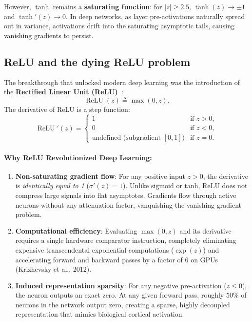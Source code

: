 However, $\tanh$ remains a \textbf{saturating function}: for $|z| \ge 2.5$, $\tanh(z) \to \pm 1$ and $\tanh'(z) \to 0$. In deep networks, as layer pre-activations naturally spread out in variance, activations drift into the saturating asymptotic tails, causing vanishing gradients to persist.

\subsection{ReLU and the dying ReLU problem}
\label{sec:relu_and_dying_relu}

The breakthrough that unlocked modern deep learning was the introduction of the \textbf{Rectified Linear Unit (ReLU)}~\cite{nair2010rectified,glorot2011deep}:
\begin{equation}
\operatorname{ReLU}(z) \triangleq \max(0, z).
\label{eq:relu_definition}
\end{equation}
The derivative of ReLU is a step function:
\begin{equation}
\operatorname{ReLU}'(z) = \begin{cases} 1 & \text{if } z > 0, \\ 0 & \text{if } z < 0, \\ \text{undefined (subgradient } [0, 1]\text{)} & \text{if } z = 0. \end{cases}
\label{eq:relu_derivative}
\end{equation}

\paragraph{Why ReLU Revolutionized Deep Learning:}
\begin{enumerate}[noitemsep,topsep=2pt,parsep=0pt,partopsep=0pt]
  \item \textbf{Non-saturating gradient flow}: For any positive input $z > 0$, the derivative is \textit{identically equal to 1} ($\sigma'(z) = 1$). Unlike sigmoid or tanh, ReLU does not compress large signals into flat asymptotes. Gradients flow through active neurons without any attenuation factor, vanquishing the vanishing gradient problem.
  \item \textbf{Computational efficiency}: Evaluating $\max(0, z)$ and its derivative requires a single hardware comparator instruction, completely eliminating expensive transcendental exponential computations ($\exp(z)$) and accelerating forward and backward passes by a factor of 6 on GPUs (Krizhevsky et al., 2012).
  \item \textbf{Induced representation sparsity}: For any negative pre-activation ($z \le 0$), the neuron outputs an exact zero. At any given forward pass, roughly $50\%$ of neurons in the network output zero, creating a sparse, highly decoupled representation that mimics biological cortical activation.
\end{enumerate}

